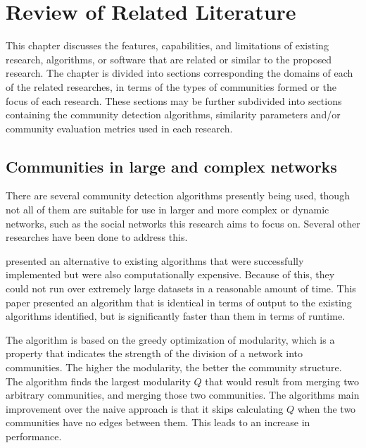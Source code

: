 %
%
%                 


\chapter{Review of Related Literature}
\label{sec:relatedlit}


This chapter discusses the features, capabilities, and limitations of existing research, algorithms, or software that are related or similar to the proposed research. The chapter is divided into sections corresponding the domains of each of the related researches, in terms of the types of communities formed or the focus of each research. These sections may be further subdivided into sections containing the community detection algorithms, similarity parameters and/or community evaluation metrics used in each research.


\section{Communities in large and complex networks}


There are several community detection algorithms presently being used, though not all of them are suitable for use in larger and more complex or dynamic networks, such as the social networks this research aims to focus on. Several other researches have been done to address this.


 presented an alternative to existing algorithms that were successfully implemented but were also computationally expensive. Because of this, they could not run over extremely large datasets in a reasonable amount of time. This paper presented an algorithm that is identical in terms of output to the existing algorithms identified, but is significantly faster than them in terms of runtime.


The algorithm is based on the greedy optimization of modularity, which is a property that indicates the strength of the division of a network into communities. The higher the modularity, the better the community structure. 
The algorithm finds the largest modularity $Q$ that would result from merging two arbitrary communities, and merging those two communities. The algorithm\vtick s main improvement over the naive approach is that it skips calculating $Q$ when the two communities have no edges between them. This leads to an increase in performance. 


